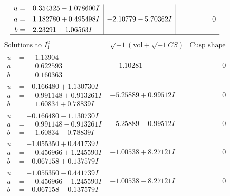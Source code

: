 \documentclass[1p]{elsarticle_modified}
\theoremstyle{definition}
\newcommand{\I}{\sqrt{-1}}
\begin{document}
$$\begin{array}{c|c|c}
\begin{aligned}
u &= \phantom{-}0.354325 - 1.078600 I \\
a &= \phantom{-}1.182780 + 0.495498 I \\
b &= \phantom{-}2.23291 + 1.06563 I\end{aligned}
 & -2.10779 - 5.70362 I & \phantom{-0.000000 } 0\\
 \hline 
 \end{array}$$\newpage$$\begin{array}{c|c|c}  
\text{Solutions to }I^u_{1}& \I (\text{vol} + \sqrt{-1}CS) & \text{Cusp shape}\\
 \hline 
\begin{aligned}
u &= \phantom{-}1.13904\phantom{ +0.000000I} \\
a &= \phantom{-}0.622593\phantom{ +0.000000I} \\
b &= \phantom{-}0.160363\phantom{ +0.000000I}\end{aligned}
 & \phantom{-}1.10281\phantom{ +0.000000I} & \phantom{-0.000000 } 0 \\ \hline\begin{aligned}
u &= -0.166480 + 1.130730 I \\
a &= \phantom{-}0.991148 + 0.913261 I \\
b &= \phantom{-}1.60834 + 0.78839 I\end{aligned}
 & -5.25889 + 0.99512 I & \phantom{-0.000000 } 0 \\ \hline\begin{aligned}
u &= -0.166480 - 1.130730 I \\
a &= \phantom{-}0.991148 - 0.913261 I \\
b &= \phantom{-}1.60834 - 0.78839 I\end{aligned}
 & -5.25889 - 0.99512 I & \phantom{-0.000000 } 0 \\ \hline\begin{aligned}
u &= -1.055350 + 0.441739 I \\
a &= \phantom{-}0.456966 + 1.245590 I \\
b &= -0.067158 + 0.137579 I\end{aligned}
 & -1.00538 + 8.27121 I & \phantom{-0.000000 } 0 \\ \hline\begin{aligned}
u &= -1.055350 - 0.441739 I \\
a &= \phantom{-}0.456966 - 1.245590 I \\
b &= -0.067158 - 0.137579 I\end{aligned}
 & -1.00538 - 8.27121 I & \phantom{-0.000000 } 0 \\ \hline\begin{aligned}

\end{aligned}
\end{array}$$
\end{document}
